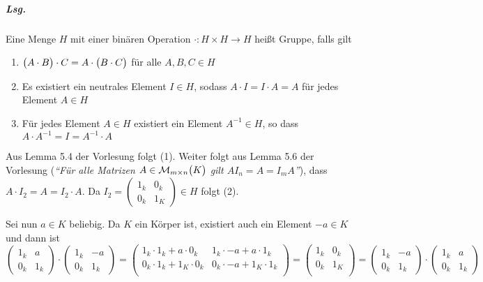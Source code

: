 \documentclass{scrreprt}
\begin{document}
\subparagraph{Lsg.} Eine Menge $H$ mit einer binären Operation
$\cdot \colon H \times H \to H$ heißt Gruppe, falls gilt
\begin{enumerate}[(1)]
\item $\qty\big(A \cdot B) \cdot C = A \cdot \qty\big(B \cdot C)$ für alle
  $A, B, C \in H$
\item Es existiert ein neutrales Element  $I \in H$, sodass
  $A \cdot I = I \cdot A = A$ für jedes Element $A \in H$
\item Für jedes Element $A \in H$ existiert ein Element $A^{-1} \in H$, so dass
  $A \cdot A^{-1} = I = A^{-1} \cdot A$
\end{enumerate}
Aus Lemma 5.4 der Vorlesung folgt (1).
Weiter folgt aus Lemma 5.6 der Vorlesung (\emph{``Für alle Matrizen
  $A \in \mathcal{M}_{m \times n}\qty\big(K)$ gilt $AI_n = A = I_mA$''}),
dass $A \cdot I_2 = A = I_2 \cdot A$.
Da $I_2 = \begin{pmatrix} 1_k & 0_k \\ 0_k & 1_K \end{pmatrix} \in H$ folgt (2).

Sei nun $a \in K$ beliebig.
Da $K$ ein Körper ist, existiert auch ein Element $-a \in K$ und dann ist
\[
  \begin{pmatrix}
    1_k & a \\
    0_k & 1_k
  \end{pmatrix}
  \cdot
  \begin{pmatrix}
    1_k & -a \\
    0_k & 1_k
  \end{pmatrix}
  =
  \begin{pmatrix}
    1_k \cdot 1_k + a \cdot 0_k & 1_k \cdot -a + a \cdot 1_k \\
    0_k \cdot 1_k + 1_K \cdot 0_k & 0_k \cdot -a + 1_K \cdot 1_k\\
  \end{pmatrix}
  =
  \begin{pmatrix}
    1_k & 0_k \\
    0_k & 1_K \\
  \end{pmatrix}
  =
  \begin{pmatrix}
    1_k & -a \\
    0_k & 1_k
  \end{pmatrix}
  \cdot
  \begin{pmatrix}
    1_k & a \\
    0_k & 1_k
  \end{pmatrix}
\]
\end{document}

